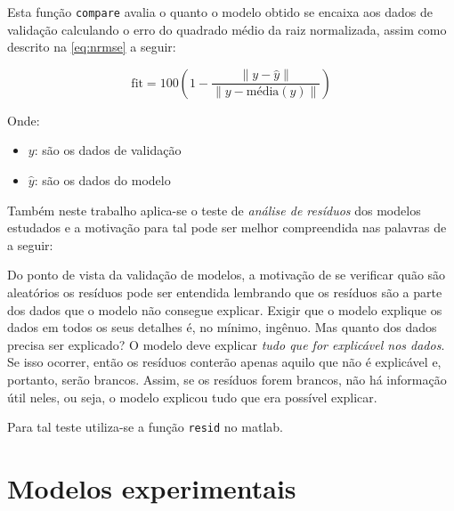 Esta função \texttt{compare} avalia o quanto o modelo obtido se encaixa aos dados de validação calculando
o erro do quadrado médio da raiz normalizada, assim como descrito na \cref{eq:nrmse} a seguir:

\begin{equation}
	\label{eq:nrmse}
	\mathrm{fit} = 100 \left( 1 - \frac{ \| y - \hat{y} \| }{ \| y - \mathrm{média}(y) \| } \right)
\end{equation}

\noindent
Onde: 
\begin{itemize}
	\item $y$: são os dados de validação
	\item $\hat{y}$: são os dados do modelo
\end{itemize}

Também neste trabalho aplica-se o teste de \textit{análise de resíduos} dos modelos estudados e a motivação
para tal pode ser melhor compreendida nas palavras de  a seguir:

\begin{citacao}
    \text{[...]} Do ponto de vista da validação de modelos, a motivação de se verificar quão são aleatórios
    os resíduos pode ser entendida lembrando que os resíduos são a parte dos dados que o modelo não
    consegue explicar. Exigir que o modelo explique os dados em todos os seus detalhes é, no mínimo,
    ingênuo. Mas quanto dos dados precisa ser explicado? O modelo deve explicar \textit{tudo que for
    explicável nos dados}. Se isso ocorrer, então os resíduos conterão apenas aquilo que não é explicável e,
    portanto, serão brancos. Assim, se os resíduos forem brancos, não há informação útil neles, ou seja,
    o modelo explicou tudo que era possível explicar. \text{[...]} 
\end{citacao}

Para tal teste utiliza-se a função \texttt{resid} no \acrshort{matlab}.

\section{Modelos experimentais}
\label{sec:modelo_experimental}

